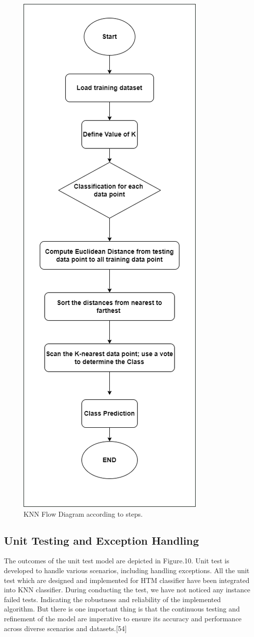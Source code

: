 \documentclass[conference]{IEEEtran}
\begin{document}
\begin{figure}
    \centering
    \includegraphics[width=0.5\linewidth]{KNNClassifier.png}
    \caption{KNN Flow Diagram according to steps.}
    \label{fig:enter-label}
\end{figure}




\subsection{Unit Testing and Exception Handling}
The outcomes of the unit test model are depicted in Figure.10. Unit test is developed to handle various scenarios, including handling exceptions. All the unit test which are designed and implemented for HTM classifier have been integrated into KNN classifier. During conducting the test, we have not noticed any instance failed tests. Indicating the robustness and reliability of the implemented algorithm. But there is one important thing is that the continuous testing and refinement of the model are imperative to ensure its accuracy and performance across diverse scenarios and datasets.[54]
\end{document}
